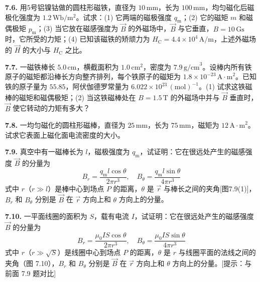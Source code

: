 \textbf{7.6.} 用5号铝镍钴做的圆柱形磁铁，直径为 $10\,\mathrm{mm}$，长为 $100\,\mathrm{mm}$，均匀磁化后磁极化强度为 $1.2\,\mathrm{Wb/m^2}$。试求：(1) 它两端的磁极强度 $q_{\mathrm{m}}$；(2) 它的磁矩 $m$ 和磁偶极矩 $p_{\mathrm{m}}$；(3) 当它放在磁感强度为 $\vec{B}$ 的外磁场中，$\vec{B}$ 与它垂直，$B = 10\,\mathrm{Gs}$ 时，它所受的力矩；(4) 已知该磁铁的矫顽力为 $H_{\mathrm{C}} = 4.4\times 10^{4}\,\mathrm{A/m}$，上述外磁场的 $\vec{H}$ 的大小与 $H_{\mathrm{C}}$ 之比。

\vfill
\newpage

\textbf{7.7.} 一磁铁棒长 $5.0\,\mathrm{cm}$，横截面积为 $1.0\,\mathrm{cm}^2$，密度为 $7.9\,\mathrm{g/cm}^3$。设棒内所有铁原子的磁矩都沿棒长方向整齐排列，每个铁原子的磁矩为 $1.8 \times 10^{-23}\,\mathrm{A\cdot m}^2$。已知铁的原子量为 $55.85$，阿伏伽德罗常量为 $6.022 \times 10^{23}\,(\mathrm{mol})^{-1}$。(1) 试求这铁磁棒的磁矩和磁偶极矩；(2) 当这铁磁棒处在 $B = 1.5\,\mathrm{T}$ 的外磁场中并与 $\vec{B}$ 垂直时，$\vec{B}$ 使它转动的力矩有多大？

\vfill
\newpage

\textbf{7.8.} 一均匀磁化的圆柱形磁棒，直径为 $25\,\mathrm{mm}$，长为 $75\,\mathrm{mm}$，磁矩为 $12\,\mathrm{A\cdot m}^{2}$。试求它表面上磁化面电流密度的大小。

\vfill
\newpage

\textbf{7.9.} 真空中有一磁棒长为 $l$，磁极强度为 $q_{\mathrm{m}}$，试证明：它在很远处产生的磁感强度 $\vec{B}$ 的分量为
\[
B_{r} = \frac{q_{\mathrm{m}} l \cos\theta}{2\pi r^{3}}, \quad B_{\theta} = \frac{q_{\mathrm{m}} l \sin\theta}{4\pi r^{3}}
\]
式中 $r$（$r \gg l$）是棒中心到场点 $P$ 的距离，$\theta$ 是 $\vec{r}$ 与棒长之间的夹角[图7.9(1)]，$B_r$ 和 $B_\theta$ 分别是 $\vec{B}$ 在 $\vec{r}$ 方向上和 $\theta$ 方向上的分量。

\begin{center}
\end{center}

\vfill
\newpage

\textbf{7.10.} 一平面线圈的面积为 $S$，载有电流 $I$，试证明：它在很远处产生的磁感强度 $\vec{B}$ 的分量为
\[
B_{r} = \frac{\mu_{0} I S \cos\theta}{2\pi r^{3}}, \quad B_{\theta} = \frac{\mu_{0} I S \sin\theta}{4\pi r^{3}}
\]
式中 $r$（$r \gg \sqrt{S}$）是线圈中心到场点 $P$ 的距离，$\theta$ 是 $r$ 与线圈平面的法线之间的夹角（图 7.10），$B_r$ 和 $B_\theta$ 分别是 $\vec{B}$ 在 $\vec{r}$ 方向上和 $\theta$ 方向上的分量。[提示：与前面 7.9 题对比]

\begin{center}
\end{center}

